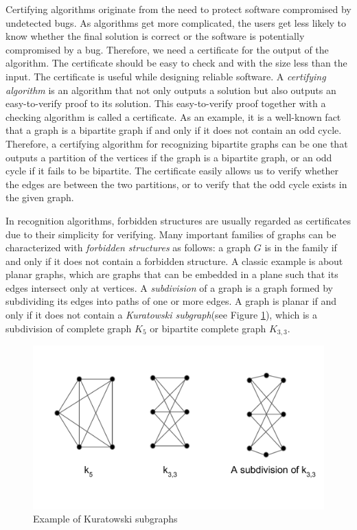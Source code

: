 Certifying algorithms originate from the need to protect software compromised by undetected bugs. As algorithms get more complicated, the users get less likely to know whether the final solution is correct or the software is potentially compromised by a bug. Therefore, we need a certificate for the output of the algorithm. The certificate should be easy to check and with the size less than the input. The certificate is useful while designing reliable software. A \emph{certifying algorithm} is an algorithm that not only outputs a solution but also outputs an easy-to-verify proof to its solution. This easy-to-verify proof together with a checking algorithm is called a certificate. As an example, it is a well-known fact that a graph is a bipartite graph if and only if it does not contain an odd cycle. Therefore, a certifying algorithm for recognizing bipartite graphs can be one that outputs a partition of the vertices if the graph is a bipartite graph, or an odd cycle if it fails to be bipartite. The certificate easily allows us to verify whether the edges are between the two partitions, or to verify that the odd cycle exists in the given graph.

In recognition algorithms, forbidden structures are usually regarded as certificates due to their simplicity for verifying. Many important families of graphs can be characterized with \emph{forbidden structures} as follows: a graph $G$ is in the family if and only if it does not contain a forbidden structure. A classic example is about planar graphs, which are graphs that can be embedded in a plane such that its edges intersect only at vertices. A \emph{subdivision} of a graph is a graph formed by subdividing its edges into paths of one or more edges. A graph is planar if and only if it does not contain a \emph{Kuratowski subgraph}(see Figure \ref{kura_subgraph}), which is a subdivision of complete graph $K_5$ or bipartite complete graph $K_{3,3}$. 

\begin{figure}[H]
\centering
\includegraphics[width=12cm]{figures/kura_subgraph.pdf}
\caption{Example of Kuratowski subgraphs}
\label{kura_subgraph}
\end{figure}

